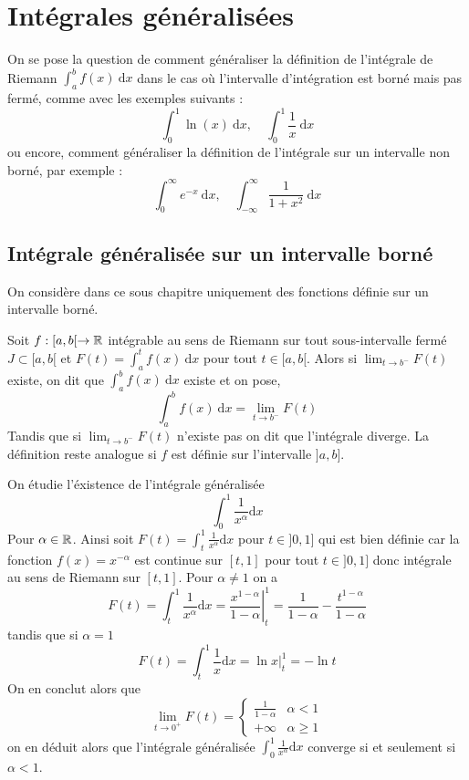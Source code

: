 \chapter{Intégrales généralisées}
On se pose la question de comment généraliser la définition de l'intégrale de Riemann $\int_a^b f(x) ~\mathrm dx$ dans le cas où l'intervalle d'intégration est borné mais pas fermé, comme avec les exemples suivants :
\[
\int_0^1 \ln(x)~\mathrm dx , \quad \int_0^1 \frac{1}{x} ~\mathrm dx
\]
ou encore, comment généraliser la définition de l'intégrale sur un intervalle non borné, par exemple :
\[
\int_0^\infty e^{-x} ~\mathrm dx, \quad \int_{-\infty}^\infty \frac{1}{1 + x^2} ~\mathrm dx
\]

\section{Intégrale généralisée sur un intervalle borné}
On considère dans ce sous chapitre uniquement des fonctions définie sur un intervalle borné.

\begin{definition} \label{def : intégrale convergente}
Soit $f : [a, b[ \to \mathbb{R}$ intégrable au sens de Riemann sur tout sous-intervalle fermé $J \subset [a,b[$ et $F(t) = \int_a^t f(x) ~\mathrm dx$ pour tout $t\in [a,b[$. Alors si $\lim_{t \to b^-} F(t)$ existe, on dit que $\int_a^b f(x) ~\mathrm dx$ existe et on pose,
	\[
	\int_a^b f(x) ~\mathrm dx = \lim_{t \to b^-} F(t)
	\]
Tandis que si $\lim_{t \to b^-} F(t)$ n'existe pas on dit que l'intégrale diverge. La définition reste analogue si $f$ est définie sur l'intervalle $]a,b]$.
\end{definition}

\begin{exemple}
	On étudie l'éxistence de l'intégrale généralisée
	\[
	\int_0^1 \frac1{x^\alpha} \mathrm d x
	\]
	Pour $\alpha \in \mathbb{R}$.
	Ainsi soit $F(t) = \int_t^1 \frac1{x^\alpha} \mathrm dx$ pour $t \in ]0,1]$ qui est bien définie car la fonction $f(x) = x^{-\alpha}$ est continue sur $[t,1]$ pour tout $t \in ]0,1]$ donc intégrale au sens de Riemann sur $[t,1]$. Pour $\alpha \neq 1$ on a
	\[
	F(t) = \int_t^1 \frac{1}{x^\alpha} \mathrm d x = \left. \frac{x^{1- \alpha}}{1 - \alpha} \right|_t^1 = \frac1{1 - \alpha} - \frac{t^{1- \alpha}}{1 - \alpha}
	\]
	tandis que si $\alpha = 1$
	\[
	F(t) = \int_t^1 \frac1x \mathrm d x = \left. \ln x \right|_t^1 = - \ln t
	\]
	On en conclut alors que
	\[
	\lim_{t \to 0^+} F(t) = \left\{\begin{array}{lc}
								\frac1{1 - \alpha} & \alpha < 1  \\
								+ \infty & \alpha \geqslant 1 
							\end{array}\right.
	\]
	on en déduit alors que l'intégrale généralisée $\int_0^1 \frac1{x^\alpha} \mathrm d x $ converge si et seulement si $\alpha < 1$.
\end{exemple}

